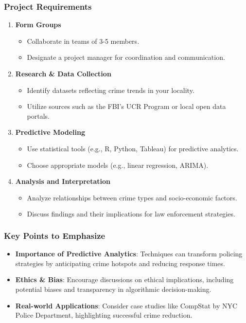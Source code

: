 \documentclass[aspectratio=169]{beamer}
\begin{document}
\begin{frame}[fragile]
    \frametitle{Project Requirements}
    \begin{enumerate}
        \item \textbf{Form Groups}
        \begin{itemize}
            \item Collaborate in teams of 3-5 members.
            \item Designate a project manager for coordination and communication.
        \end{itemize}
        
        \item \textbf{Research \& Data Collection}
        \begin{itemize}
            \item Identify datasets reflecting crime trends in your locality.
            \item Utilize sources such as the FBI’s UCR Program or local open data portals.
        \end{itemize}

        \item \textbf{Predictive Modeling}
        \begin{itemize}
            \item Use statistical tools (e.g., R, Python, Tableau) for predictive analytics.
            \item Choose appropriate models (e.g., linear regression, ARIMA).
        \end{itemize}
        
        \item \textbf{Analysis and Interpretation}
        \begin{itemize}
            \item Analyze relationships between crime types and socio-economic factors.
            \item Discuss findings and their implications for law enforcement strategies.
        \end{itemize}
    \end{enumerate}
\end{frame}

\begin{frame}[fragile]
    \frametitle{Key Points to Emphasize}
    \begin{itemize}
        \item \textbf{Importance of Predictive Analytics}: Techniques can transform policing strategies by anticipating crime hotspots and reducing response times.
        
        \item \textbf{Ethics \& Bias}: Encourage discussions on ethical implications, including potential biases and transparency in algorithmic decision-making.
        
        \item \textbf{Real-world Applications}: Consider case studies like CompStat by NYC Police Department, highlighting successful crime reduction.
    \end{itemize}
\end{frame}
\end{document}
